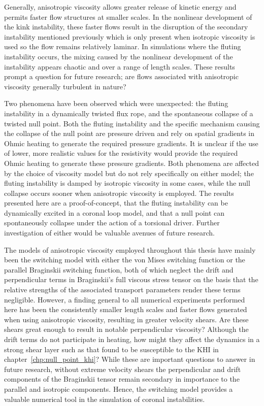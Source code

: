 Generally, anisotropic viscosity allows greater release of kinetic energy and permits faster flow structures at smaller scales. In the nonlinear development of the kink instability, these faster flows result in the disruption of the secondary instability mentioned previously which is only present when isotropic viscosity is used so the flow remains relatively laminar. In simulations where the fluting instability occurs, the mixing caused by the nonlinear development of the instability appears chaotic and over a range of length scales. These results prompt a question for future research; are flows associated with anisotropic viscosity generally turbulent in nature? 

Two phenomena have been observed which were unexpected: the fluting instability in a dynamically twisted flux rope, and the spontaneous collapse of a twisted null point. Both the fluting instability and the specific mechanism causing the collapse of the null point are pressure driven and rely on spatial gradients in Ohmic heating to generate the required pressure gradients. It is unclear if the use of lower, more realistic values for the resistivity would provide the required Ohmic heating to generate these pressure gradients. Both phenomena are affected by the choice of viscosity model but do not rely specifically on either model; the fluting instability is damped by isotropic viscosity in some cases, while the null collapse occurs sooner when anisotropic viscosity is employed. The results presented here are a proof-of-concept, that the fluting instability can be dynamically excited in a coronal loop model, and that a null point can spontaneously collapse under the action of a torsional driver. Further investigation of either would be valuable avenues of future research.

The models of anisotropic viscosity employed throughout this thesis have mainly been the switching model with either the von Mises switching function or the parallel Braginskii switching function, both of which neglect the drift and perpendicular terms in Braginskii's full viscous stress tensor on the basis that the relative strengths of the associated transport parameters render these terms negligible. However, a finding general to all numerical experiments performed here has been the consistently smaller length scales and faster flows generated when using anisotropic viscosity, resulting in greater velocity shears. Are these shears great enough to result in notable perpendicular viscosity? Although the drift terms do not participate in heating, how might they affect the dynamics in a strong shear layer such as that found to be susceptible to the KHI in chapter~\ref{chp:null_point_khi}? While these are important questions to answer in future research, without extreme velocity shears the perpendicular and drift components of the Braginskii tensor remain secondary in importance to the parallel and isotropic components. Hence, the switching model provides a valuable numerical tool in the simulation of coronal instabilities.

